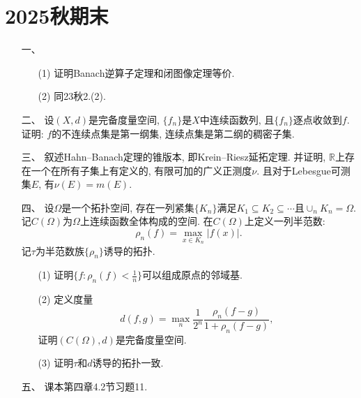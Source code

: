 \section{2025秋期末}
\begin{itemize}
\item[一、]
\begin{itemize}
    \item[(1)]证明Banach逆算子定理和闭图像定理等价.
    \item[(2)]同23秋2.(2).
\end{itemize}

\item[二、]设$(X,d)$是完备度量空间, $\{f_n\}$是$X$中连续函数列, 且$\{f_n\}$逐点收敛到$f$. 
证明: $f$的不连续点集是第一纲集, 连续点集是第二纲的稠密子集.

\item[三、]叙述Hahn--Banach定理的锥版本, 即Krein--Riesz延拓定理. 并证明, $\mathbb{R}$上存在一个在所有子集上有定义的, 有限可加的广义正测度$\nu$. 且对于Lebesgue可测集$E$, 有$\nu(E)=m(E)$.

\item[四、]设$\Omega$是一个拓扑空间, 存在一列紧集$\{K_n\}$满足$K_1\subseteq K_2\subseteq \cdots$且$\cup_n K_n=\Omega$. 
记$C(\Omega)$为$\Omega$上连续函数全体构成的空间. 在$C(\Omega)$上定义一列半范数:
$$\rho_n(f)=\max_{x\in K_n}|f(x)|.$$
记$\tau$为半范数族$\{\rho_n\}$诱导的拓扑.
\begin{itemize}
    \item[(1)]证明$\{f:\rho_n(f)<\frac{1}{n}\}$可以组成原点的邻域基.
    \item[(2)]定义度量
    $$d(f,g)=\max_n\frac{1}{2^n}\frac{\rho_n(f-g)}{1+\rho_n(f-g)},$$
    证明$(C(\Omega),d)$是完备度量空间.
    \item[(3)]证明$\tau$和$d$诱导的拓扑一致.
\end{itemize}

\item[五、]课本第四章4.2节习题11.

\end{itemize}

